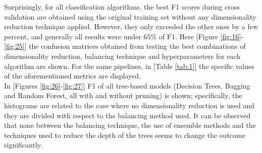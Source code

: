 \documentclass[letterpaper]{article}
\begin{document}
	Surprisingly, for all classification algorithms, the best F1 scores during cross validation are obtained using the original training set without any dimensionality reduction technique applied. However, they only exceeded the other ones by a few percent, and generally all results were under $65\%$ of F1. Here [Figure \ref{fig:16}-\ref{fig:25}] the confusion matrices obtained from testing the best combinations of dimensionality reduction, balancing technique and hyperparameters for each algorithm are shown. For the same pipelines, in [Table \ref{tab:1}] the specific values of the aforementioned metrics are displayed.\\
	In [Figures \ref{fig:26}-\ref{fig:27}] F1 of all tree-based models (Decision Trees, Bagging and Random Forest, all with and without pruning) is shown; specifically, the histograms are related to the case where no dimensionality reduction is used and they are divided with respect to the balancing method used. It can be observed that none between the balancing technique, the use of ensemble methods and the techniques used to reduce the depth of the trees seems to change the outcome significantly. \par
\end{document}
